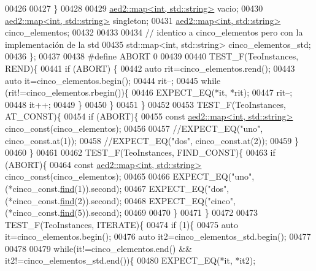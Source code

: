 \begin{DoxyCode}
00426 
00427     \}
00428 
00429     \hyperlink{classaed2_1_1map}{aed2::map<int, std::string>} vacio;
00430     \hyperlink{classaed2_1_1map}{aed2::map<int, std::string>} singleton;
00431     \hyperlink{classaed2_1_1map}{aed2::map<int, std::string>} cinco\_elementos;
00432 
00433 
00434     \textcolor{comment}{// identico a cinco\_elementos pero con la implementación de la std}
00435     std::map<int, std::string> cinco\_elementos\_std;
00436 \};
00437 
00438 \textcolor{preprocessor}{#define ABORT 0}
00439 
00440 TEST\_F(TeoInstances, REND)\{
00441     \textcolor{keywordflow}{if} (ABORT) \{
00442         \textcolor{keyword}{auto} rit=cinco\_elementos.rend();
00443         \textcolor{keyword}{auto} it=cinco\_elementos.begin();
00444         rit--;
00445         \textcolor{keywordflow}{while} (rit!=cinco\_elementos.rbegin())\{
00446             EXPECT\_EQ(*it, *rit);
00447             rit--;
00448             it++;
00449         \}
00450     \}
00451 \}
00452 
00453 TEST\_F(TeoInstances, AT\_CONST)\{
00454         \textcolor{keywordflow}{if} (ABORT)\{
00455         \textcolor{keyword}{const} \hyperlink{classaed2_1_1map}{aed2::map<int, std::string>} cinco\_const(cinco\_elementos);
00456 
00457         \textcolor{comment}{//EXPECT\_EQ("uno", cinco\_const.at(1));}
00458         \textcolor{comment}{//EXPECT\_EQ("dos", cinco\_const.at(2));}
00459     \}
00460 \}
00461 
00462 TEST\_F(TeoInstances, FIND\_CONST)\{
00463         \textcolor{keywordflow}{if} (ABORT)\{
00464         \textcolor{keyword}{const} \hyperlink{classaed2_1_1map}{aed2::map<int, std::string>} cinco\_const(cinco\_elementos);
00465 
00466         EXPECT\_EQ(\textcolor{stringliteral}{"uno"}, (*cinco\_const.\hyperlink{classaed2_1_1map_afd0fc1a8234888e61e0e615de7e245b8_afd0fc1a8234888e61e0e615de7e245b8}{find}(1)).second);
00467         EXPECT\_EQ(\textcolor{stringliteral}{"dos"}, (*cinco\_const.\hyperlink{classaed2_1_1map_afd0fc1a8234888e61e0e615de7e245b8_afd0fc1a8234888e61e0e615de7e245b8}{find}(2)).second);
00468         EXPECT\_EQ(\textcolor{stringliteral}{"cinco"}, (*cinco\_const.\hyperlink{classaed2_1_1map_afd0fc1a8234888e61e0e615de7e245b8_afd0fc1a8234888e61e0e615de7e245b8}{find}(5)).second);
00469 
00470     \}
00471 \}
00472 
00473 TEST\_F(TeoInstances, ITERATE)\{
00474         \textcolor{keywordflow}{if} (1)\{
00475         \textcolor{keyword}{auto} it=cinco\_elementos.begin();
00476         \textcolor{keyword}{auto} it2=cinco\_elementos\_std.begin();
00477 
00478 
00479         \textcolor{keywordflow}{while}(it!=cinco\_elementos.end() && it2!=cinco\_elementos\_std.end())\{
00480             EXPECT\_EQ(*it, *it2);

\end{DoxyCode}
